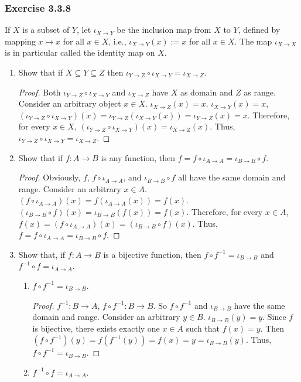 \documentclass[12pt, letter]{article}
\begin{document}
\subsubsection*{Exercise 3.3.8}
If $X$ is a subset of $Y$, let $\iota_{X\to Y}$ be the inclusion map from $X$ to $Y$, defined by mapping $x\mapsto x$ for all $x\in X$, i.e., $\iota_{X\to Y}(x):=x$ for all $x\in X$.
The map $\iota_{X\to X}$ is in particular called the identity map on $X$.
\begin{enumerate}
    \item Show that if $X\subseteq Y\subseteq Z$ then $\iota_{Y\to Z}\circ\iota_{X\to Y}=\iota_{X\to Z}$.
    \begin{proof}
        Both $\iota_{Y\to Z}\circ\iota_{X\to Y}$ and $\iota_{X\to Z}$ have $X$ as domain and $Z$ as range. Consider an arbitrary object $x\in X$. $\iota_{X\to Z}(x)=x$. 
        $\iota_{X\to Y}(x)=x$, $(\iota_{Y\to Z}\circ\iota_{X\to Y})(x)=\iota_{Y\to Z}(\iota_{X\to Y}(x))=\iota_{Y\to Z}(x)=x$. Therefore, for every $x\in X$, $(\iota_{Y\to Z}\circ\iota_{X\to Y})(x)=\iota_{X\to Z}(x)$.
        Thus, $\iota_{Y\to Z}\circ\iota_{X\to Y}=\iota_{X\to Z}$.
    \end{proof}
    \item Show that if $f:A\to B$ is any function, then $f=f\circ\iota_{A\to A}=\iota_{B\to B}\circ f$.
    \begin{proof}
        Obviously, $f$, $f\circ\iota_{A\to A}$, and $\iota_{B\to B}\circ f$ all have the same domain and range. Consider an arbitrary $x\in A$. $(f\circ\iota_{A\to A})(x)=f(\iota_{A\to A}(x))=f(x)$. 
        $(\iota_{B\to B}\circ f)(x)=\iota_{B\to B}(f(x))=f(x)$. Therefore, for every $x\in A$, $f(x)=(f\circ\iota_{A\to A})(x)=(\iota_{B\to B}\circ f)(x)$. Thus, $f=f\circ\iota_{A\to A}=\iota_{B\to B}\circ f$.
    \end{proof}
    \item Show that, if $f:A\to B$ is a bijective function, then $f\circ f^{-1}=\iota_{B\to B}$ and $f^{-1}\circ f=\iota_{A\to A}$.
    \begin{enumerate}
        \item $f\circ f^{-1}=\iota_{B\to B}$.
        \begin{proof}
            $f^{-1}:B\to A$, $f\circ f^{-1}:B\to B$. So $f\circ f^{-1}$ and $\iota_{B\to B}$ have the same domain and range. Consider an arbitrary $y\in B$. $\iota_{B\to B}(y)=y$. Since $f$ is bijective, there exists exactly one $x\in A$ such that $f(x)=y$. 
            Then $(f\circ f^{-1})(y)=f(f^{-1}(y))=f(x)=y=\iota_{B\to B}(y)$. Thus, $f\circ f^{-1}=\iota_{B\to B}$.
        \end{proof}
        \item $f^{-1}\circ f=\iota_{A\to A}$.
        

\end{enumerate}
\end{enumerate}
\end{document}
